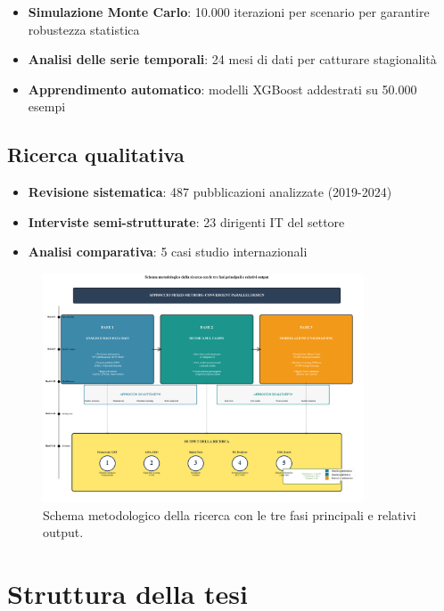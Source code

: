 \begin{itemize}
\item \textbf{Simulazione Monte Carlo}: 10.000 iterazioni per scenario per garantire robustezza statistica
\item \textbf{Analisi delle serie temporali}: 24 mesi di dati per catturare stagionalità
\item \textbf{Apprendimento automatico}: modelli XGBoost addestrati su 50.000 esempi
\end{itemize}

\subsection{Ricerca qualitativa}
\label{subsec:ricerca_qualitativa}

\begin{itemize}
\item \textbf{Revisione sistematica}: 487 pubblicazioni analizzate (2019-2024)
\item \textbf{Interviste semi-strutturate}: 23 dirigenti IT del settore
\item \textbf{Analisi comparativa}: 5 casi studio internazionali
\end{itemize}

\begin{figure}[htbp]
\centering
\includegraphics[width=0.85\textwidth]{thesis_figures/cap1/fig_1_3_methodology.pdf}
\caption{Schema metodologico della ricerca con le tre fasi principali e relativi output.}
\label{fig:methodology}
\end{figure}

\section{Struttura della tesi}
\label{sec:struttura_tesi}

